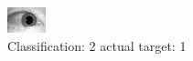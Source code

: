 \begin{figure}[h!]
\begin{center}
\includegraphics[width=0.60\columnwidth]{figures/ID1456_class_2_target_1.png}
\end{center}
\caption{ Classification: 2 actual target: 1}
\label{fig:ID1456_class_2_target_1}
\end{figure}
